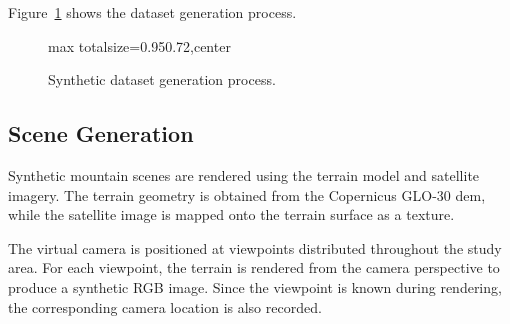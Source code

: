Figure~\ref{fig:synthetic_dataset_pipeline} shows the dataset generation process.

\begin{figure}[H]
\centering
\begin{adjustbox}{max totalsize={0.95\textwidth}{0.72\textheight},center}
\end{adjustbox}
\caption{Synthetic dataset generation process.}
\label{fig:synthetic_dataset_pipeline}
\end{figure}

\subsection{Scene Generation}

Synthetic mountain scenes are rendered using the terrain model and satellite imagery. The terrain geometry is obtained from the Copernicus GLO-30 \gls{dem}, while the satellite image is mapped onto the terrain surface as a texture.

The virtual camera is positioned at viewpoints distributed throughout the study area. For each viewpoint, the terrain is rendered from the camera perspective to produce a synthetic RGB image. Since the viewpoint is known during rendering, the corresponding camera location is also recorded.

